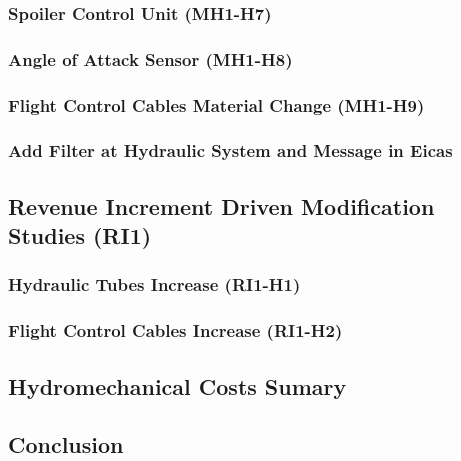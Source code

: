     \subsubsection{Spoiler Control Unit (MH1-H7)}
       
    \subsubsection{Angle of Attack Sensor (MH1-H8)}
       
    \subsubsection{Flight Control Cables Material Change (MH1-H9)}
        
    \subsubsection{Add Filter at Hydraulic System and Message in Eicas}
       

\subsection{Revenue Increment Driven Modification Studies (RI1)}
    \subsubsection{Hydraulic Tubes Increase (RI1-H1)}
        
    \subsubsection{Flight Control Cables Increase (RI1-H2)}
       

\subsection{Hydromechanical Costs Sumary}
    

\subsection{Conclusion}
    
